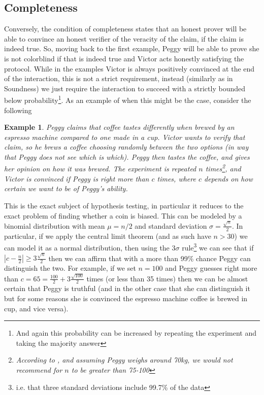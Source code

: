 \documentclass{article}
\newtheorem{example}{Example}
\begin{document}
\subsection{Completeness}
Conversely, the condition of completeness states that an honest prover will be able to convince an honest verifier of the veracity of the claim, if the claim is indeed true. So, moving back to the first example, Peggy will be able to prove she is not colorblind if that is indeed true and Victor acts honestly satisfying the protocol. While in the examples Victor is always positively convinced at the end of the interaction, this is not a strict requirement, instead (similarly as in Soundness) we just require the interaction to succeed with a strictly bounded below probability\footnote{And again this probability can be increased by repeating the experiment and taking the majority answer}. As an example of when this might be the case, consider the following \begin{example}
    Peggy claims that coffee tastes differently when brewed by an espresso machine compared to one made in a cup. Victor wants to verify that claim, so he brews a coffee choosing randomly between the two options (in way that Peggy does not see which is which). Peggy then tastes the coffee, and gives her opinion on how it was brewed. The experiment is repeated $n$ times\footnote{According to \cite{chambersChemIDplus0000302272XFSBVAOIAHNAPCNPVHKAFCSAN}, and assuming Peggy weighs around 70kg, we would not recommend for $n$ to be greater than 75-100}, and Victor is convinced if Peggy is right more than $c$ times, where $c$ depends on how certain we want to be of Peggy's ability.
\end{example}

This is the exact subject of hypothesis testing, in particular it reduces to the exact problem of finding whether a coin is biased. This can be modeled by a binomial distribution with mean $\mu = n/2$ and standard deviation $\sigma = \frac{\sqrt{n}}{2}$. In particular, if we apply the central limit theorem (and as such have $n > 30$) we can model it as a normal distribution, then using the $3\sigma$ rule\footnote{i.e. that three standard deviations include 99.7\% of the data} we can see that if $|c - \frac{n}{2}| \geq 3\frac{\sqrt{n}}{2}$ then we can affirm that with a more than 99\% chance Peggy can distinguish the two. For example, if we set $n = 100$ and Peggy guesses right more than $c = 65 = \frac{100}{2} + 3 \frac{\sqrt{100}}{2}$ times (or less than 35 times) then we can be almost certain that Peggy is truthful (and in the other case that she can distinguish it but for some reasons she is convinced the espresso machine coffee is brewed in cup, and vice versa).
\end{document}
